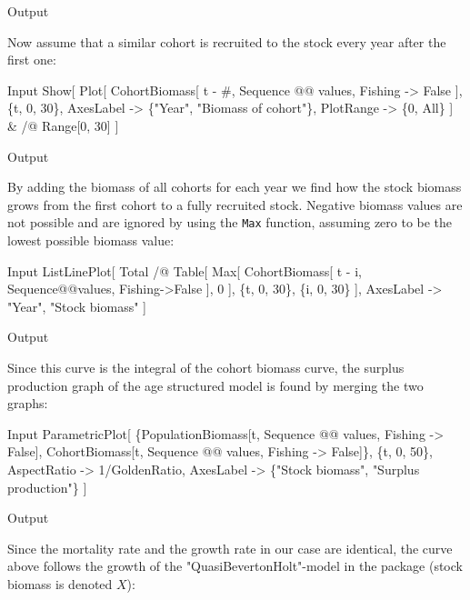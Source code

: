 \documentclass[11pt,fleqn]{book} %
\begin{document}
\begin{theorem}
\begin{flushleft}
\begin{mmaCell}[moregraphics={moreig={scale=.6}}]{Output}
\end{mmaCell}
Now assume that a similar cohort is recruited to the stock every year after the first one:
\begin{mmaCell}{Input}
  Show[
    Plot[
      CohortBiomass[
        t - #, 
        Sequence @@ values, 
        Fishing -> False
      ], \{t, 0, 30\}, 
      AxesLabel -> \{"Year", "Biomass of cohort"\}, 
      PlotRange -> \{0, All\}
    ] & /@ Range[0, 30]
  ]
\end{mmaCell}
\begin{mmaCell}[moregraphics={moreig={scale=.6}}]{Output}
\end{mmaCell}
By adding the biomass of all cohorts for each year we find how the stock biomass grows from the first cohort to a fully recruited stock. Negative biomass values are not possible and are ignored by using the \texttt{Max} function, assuming zero to be the lowest possible biomass value:
\begin{mmaCell}{Input}
  ListLinePlot[
    Total /@ Table[
      Max[
        CohortBiomass[
          t - i, Sequence@@values, Fishing->False
        ], 0
      ], \{t, 0, 30\}, \{i, 0, 30\}
    ],
    AxesLabel -> {"Year", "Stock biomass"}
  ]
\end{mmaCell}
\begin{mmaCell}[moregraphics={moreig={scale=.6}}]{Output}
\end{mmaCell}
Since this curve is the integral of the cohort biomass curve, the surplus production graph of the age structured model is found by merging the two graphs:
\begin{mmaCell}{Input}
  ParametricPlot[
    \{PopulationBiomass[t, Sequence @@ values, Fishing -> False], 
    CohortBiomass[t, Sequence @@ values, Fishing -> False]\},
    \{t, 0, 50\}, 
    AspectRatio -> 1/GoldenRatio, 
    AxesLabel   -> \{"Stock biomass", "Surplus production"\}
  ]
\end{mmaCell}
\begin{mmaCell}[moregraphics={moreig={scale=.6}}]{Output}
\end{mmaCell}
Since the mortality rate and the growth rate in our case are identical, the curve above follows the growth of the "QuasiBevertonHolt"-model in the package (stock biomass is denoted $X$):

\end{flushleft}
\end{theorem}
\end{document}
